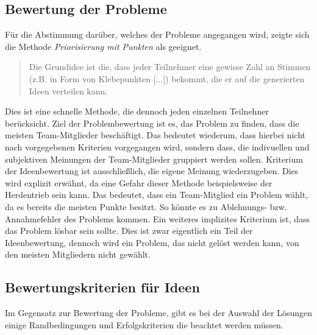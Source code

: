 \subsection{Bewertung der Probleme}\label{sec:retro-punkte}
Für die Abstimmung darüber, welches der Probleme angegangen wird, zeigte sich die Methode \textit{Priorisierung mit Punkten} 
als geeignet. 
\begin{quote}
    Die Grundidee ist die, dass jeder Teilnehmer eine gewisse Zahl an Stimmen (z.B. in Form von Klebepunkten [...]) bekommt, die er auf die generierten Ideen verteilen kann. \cite{dotmocracy:2011}
\end{quote} 
Dies ist eine schnelle Methode, die dennoch jeden einzelnen Teilnehner berücksicht. Ziel der Problembewertung ist es, das Problem zu 
finden, dass die meisten Team-Mitglieder beschäftigt. Das bedeutet wiederum, dass hierbei nicht nach vorgegebenen Kriterien 
vorgegangen wird, sondern dass, die indivuellen und subjektiven Meinungen der Team-Mitglieder gruppiert werden sollen. 
Kriterium der Ideenbewertung ist ausschließlich, die eigene Meinung wiederzugeben. Dies wird explizit erwähnt, 
da eine Gefahr dieser Methode beispielsweise der Herdentrieb sein kann. Das bedeutet, dass ein Team-Mitglied 
ein Problem wählt, da es bereits die meisten Punkte besitzt. So könnte es zu Ablehnungs- bzw. Annahmefehler des Problems kommen. \cite{derby:2012}
Ein weiteres implizites Kriterium ist, dass das Problem lösbar sein sollte. Dies ist zwar eigentlich ein Teil der Ideenbewertung, 
dennoch wird ein Problem, das nicht gelöst werden kann, von den meisten Mitgliedern nicht gewählt. 

\subsection{Bewertungskriterien für Ideen}\label{sec:retro-kriterien}
Im Gegensatz zur Bewertung der Probleme, gibt es bei der Auswahl der Lösungen einige Randbedingungen
und Erfolgskriterien die beachtet werden müssen.

